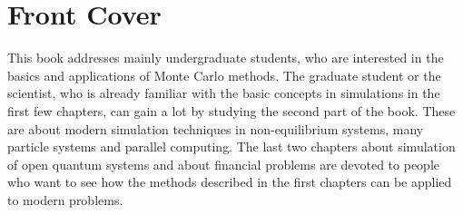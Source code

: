 \chapter*{Front Cover}

\thispagestyle{empty}

This book addresses mainly undergraduate students, who are interested in the basics and
applications of Monte Carlo methods.
The graduate student or the scientist, who is already familiar with 
the basic concepts in simulations in the first few chapters, 
can gain a lot by studying the second part of the book.
These are about modern simulation techniques in non-equilibrium systems, 
many particle systems and parallel computing.
The last two chapters about simulation of open quantum systems and about 
financial problems are devoted to people who want to see how the methods 
described in the first chapters can be applied to modern problems.


